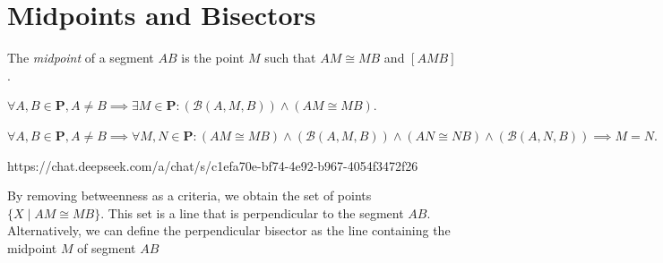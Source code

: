 \documentclass[../../../main/main.tex]{subfiles}
\begin{document}
\chapter{Midpoints and Bisectors}

The \textit{midpoint} of a segment $AB$ is the point $M$ such that $AM \cong MB$ and $[AMB]$.

\begin{axiom}
    $\forall A,B\in\mathbf{P}, A\neq B \implies \exists M\in\mathbf{P}\colon (\mathcal{B}(A,M,B)) \land (AM \cong MB)$.
\end{axiom}

\begin{axiom}
    $\forall A,B\in\mathbf{P}, A\neq B \implies \forall M,N\in\mathbf{P}\colon (AM \cong MB) \land (\mathcal{B}(A,M,B)) \land (AN \cong NB) \land (\mathcal{B}(A,N,B)) \implies M = N.$
\end{axiom}

https://chat.deepseek.com/a/chat/s/c1efa70e-bf74-4e92-b967-4054f3472f26

By removing betweenness as a criteria, we obtain the set of points $\{ X \mid AM \cong MB \}$. This set is a line that is perpendicular to the segment $AB$. Alternatively, we can define the perpendicular bisector as the line containing the midpoint $M$ of segment $AB$
\end{document}
